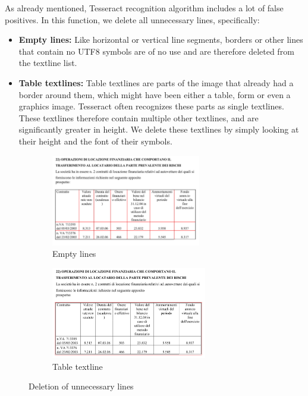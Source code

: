 \begin{description}
As already mentioned, Tesseract recognition algorithm includes a lot of false positives. In this function, we delete all unnecessary lines, specifically:

\begin{itemize}
\item\textbf {Empty lines: } Like horizontal or vertical line segments, borders or other lines that contain no UTF8 symbols are of no use and are therefore deleted from the textline list.

\item\textbf {Table textlines: } Table textlines are parts of the image that already had a border around them, which might have been either a table, form or even a graphics image. Tesseract often recognizes these parts as single textlines. These textlines therefore contain multiple other textlines, and are significantly greater in height. We delete these textlines by simply looking at their height and the font of their symbols.
\end{itemize}

\begin{figure}[H]
\begin{subfigure}{0.45\textwidth}
\includegraphics[width=\linewidth,height=40mm]{img/implementation/textlineEmpty.png}
\caption{Empty lines} \label{fig:1b}
\end{subfigure}
\qquad
\begin{subfigure}{0.45\textwidth}
\includegraphics[width=\linewidth,height=40mm]{img/implementation/textlineTable.png}
\caption{Table textline} \label{fig:1c}
\end{subfigure}
\caption{Deletion of unnecessary lines} \label{fig:1}
\end{figure}


\end{description}
